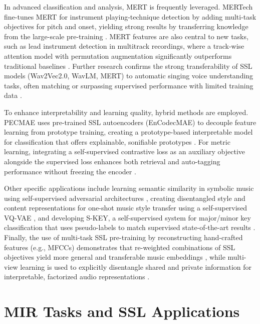 \documentclass[12pt]{report}
\begin{document}
In advanced classification and analysis, MERT is frequently leveraged. MERTech fine-tunes MERT for instrument playing-technique detection by adding multi-task objectives for pitch and onset, yielding strong results by transferring knowledge from the large-scale pre-training \cite{li_mertech_2024}. MERT features are also central to new tasks, such as lead instrument detection in multitrack recordings, where a track-wise attention model with permutation augmentation significantly outperforms traditional baselines \cite{ou_lead_2025}. Further research confirms the strong transferability of SSL models (Wav2Vec2.0, WavLM, MERT) to automatic singing voice understanding tasks, often matching or surpassing supervised performance with limited training data \cite{yamamoto_toward_2023}.

To enhance interpretability and learning quality, hybrid methods are employed. PECMAE uses pre-trained SSL autoencoders (EnCodecMAE) to decouple feature learning from prototype training, creating a prototype-based interpretable model for classification that offers explainable, sonifiable prototypes \cite{alonso-jimenez_leveraging_2024}. For metric learning, integrating a self-supervised contrastive loss as an auxiliary objective alongside the supervised loss enhances both retrieval and auto-tagging performance without freezing the encoder \cite{akama_self-supervised_2023}.

Other specific applications include learning semantic similarity in symbolic music using self-supervised adversarial architectures \cite{bretan_learning_2019}, creating disentangled style and content representations for one-shot music style transfer using a self-supervised VQ-VAE \cite{cifka_self-supervised_2021}, and developing S-KEY, a self-supervised system for major/minor key classification that uses pseudo-labels to match supervised state-of-the-art results \cite{kong_s-key_2025}. Finally, the use of multi-task SSL pre-training by reconstructing hand-crafted features (e.g., MFCCs) demonstrates that re-weighted combinations of SSL objectives yield more general and transferable music embeddings \cite{wu_multi-task_2021}, while multi-view learning is used to explicitly disentangle shared and private information for interpretable, factorized audio representations \cite{wilkins_self-supervised_2024}.



\section{MIR Tasks and SSL Applications}
\end{document}
